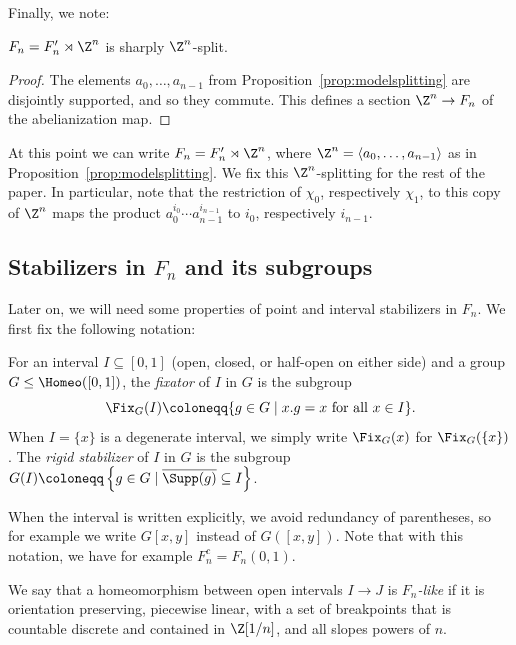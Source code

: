Finally, we note:

\begin{coro}
\label{cor:Fsplit}
$F_n = F_n' \rtimes \Z^n$ is sharply $\Z^n$-split.
\end{coro}

\begin{proof}
The elements $a_0, \ldots, a_{n-1}$ from Proposition~\ref{prop:modelsplitting} are disjointly supported, and so they commute. This defines a section $\Z^n \to F_n$ of the abelianization map.
\end{proof}

At this point we can write $F_n = F_n' \rtimes \Z^n$, where $\Z^n = \langle a_0, \ldots, a_{n-1} \rangle$ as in Proposition~\ref{prop:modelsplitting}. We fix this $\Z^n$-splitting for the rest of the paper. In particular, note that the restriction of $\chi_0$, respectively $\chi_1$, to this copy of $\Z^n$ maps the product $a_0^{i_0}\cdots a_{n-1}^{i_{n-1}}$ to $i_0$, respectively $i_{n-1}$.


\subsection{Stabilizers in \texorpdfstring{$F_n$}{Fn} and its subgroups}

Later on, we will need some properties of point and interval stabilizers in $F_n$. We first fix the following notation:

\begin{defi}
For an interval $I \subseteq [0, 1]$ (open, closed, or half-open on either side) and a group $G \leq \Homeo([0, 1])$, the \emph{fixator} of $I$ in $G$ is the subgroup
\[
\Fix_G(I) \coloneqq \{ g \in G \mid x.g = x \text{ for all } x \in I \}.
\]
When $I = \{ x \}$ is a degenerate interval, we simply write $\Fix_G(x)$ for $\Fix_G(\{x\})$. The \emph{rigid stabilizer} of $I$ in $G$ is the subgroup $G(I) \coloneqq \left\{ g \in G \mid \overline{\Supp(g)} \subseteq I \right\}$.
\end{defi}

When the interval is written explicitly, we avoid redundancy of parentheses, so for example we write $G[x, y]$ instead of $G([x, y])$. Note that with this notation, we have for example $F_n^c = F_n(0, 1)$.

\begin{defi}
We say that a homeomorphism between open intervals $I \to J$ is \emph{$F_n$-like} if it is orientation preserving, piecewise linear, with a set of breakpoints that is countable discrete and contained in $\Z[1/n]$, and all slopes powers of $n$.
\end{defi}

